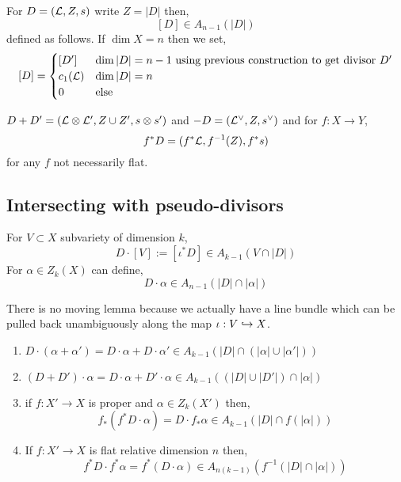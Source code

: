 \documentclass[12pt]{article}
\begin{document}
\begin{defn}
For $D = (\mathcal{L}, Z, s)$ write $Z = |D|$ then,
\[ [D] \in A_{n-1}(|D|) \]
defined as follows. If $\dim{X} = n$ then we set,
\[ [D] = 
\begin{cases}
[D'] & \dim{|D|} = n - 1 \text{ using previous construction to get divisor } D'
\\
c_1(\mathcal{L}) & \dim{|D|} = n
\\
0 & \text{else}
\end{cases} \]
\end{defn}

\begin{defn}
$D + D' = (\mathcal{L} \otimes \mathcal{L}', Z \cup Z', s \otimes s')$ and $-D = (\mathcal{L}^\vee, Z, s^\vee)$ and for $f : X \to Y$,
\[ f^* D = (f^* \mathcal{L}, f^{-1}(Z), f^* s) \]
for any $f$ not necessarily flat.
\end{defn}

\subsection{Intersecting with pseudo-divisors}

\begin{defn}
For $V \subset X$ subvariety of dimension $k$, 
\[ D \cdot [V] := [\iota^* D] \in A_{k-1}(V \cap |D|) \]
For $\alpha \in Z_k(X)$ can define,
\[ D \cdot \alpha \in A_{n-1}(|D| \cap |\alpha|) \]
\end{defn}

\begin{rmk}
There is no moving lemma because we actually have a line bundle which can be pulled back unambiguously along the map $\iota : V \hookrightarrow X$.
\end{rmk}

\begin{prop}
\begin{enumerate}
\item $D \cdot (\alpha + \alpha') = D \cdot \alpha + D \cdot \alpha' \in A_{k-1}(|D| \cap (|\alpha| \cup |\alpha'|))$

\item $(D + D') \cdot \alpha = D \cdot \alpha + D' \cdot \alpha \in A_{k-1}((|D| \cup |D'|) \cap |\alpha|)$

\item if $f : X' \to X$ is proper and $\alpha \in Z_k(X')$ then,
\[ f_* (f^* D \cdot \alpha) = D \cdot f_* \alpha \in A_{k-1}(|D| \cap f(|\alpha|)) \]

\item If $f : X' \to X$ is flat relative dimension $n$ then,
\[ f^* D \cdot f^* \alpha = f^* (D \cdot \alpha) \in A_{n(k-1)}(f^{-1}(|D| \cap |\alpha|)) \]
\end{enumerate}
\end{prop}
\end{document}
